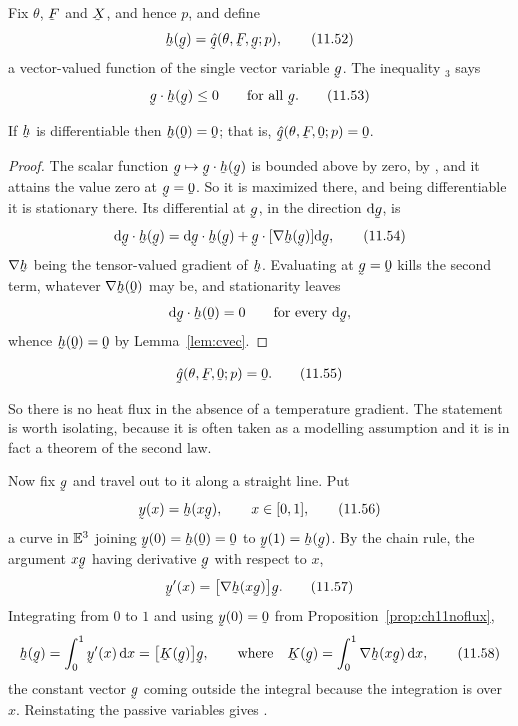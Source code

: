 Fix $\theta$, $\bF$ and $\bX$, and hence $p$, and define
\begin{equation}
   \bh(\bg)=\hat\bq(\theta,\bF,\bg;p),
   \tag{11.52}\label{eq:11.52}
\end{equation}
a vector-valued function of the single vector variable $\bg$. The
inequality $_{3}$ says
\begin{equation}
   \ip\bg{\bh(\bg)}\leq0\qquad\text{for all }\bg .
   \tag{11.53}\label{eq:11.53}
\end{equation}

\begin{proposition}\label{prop:ch11noflux}
If $\bh$ is differentiable then $\bh(\bze)=\bze$; that is,
$\hat\bq(\theta,\bF,\bze;p)=\bze$.
\end{proposition}

\begin{proof}
The scalar function $\bg\mapsto\ip\bg{\bh(\bg)}$ is bounded above by
zero, by , and it attains the value zero at $\bg=\bze$. So it
is maximized there, and being differentiable it is stationary there. Its
differential at $\bg$, in the direction $\dl\bg$, is
\begin{equation}
   \dl\ip\bg{\bh(\bg)}
   =\ip{\dl\bg}{\bh(\bg)}+\ip\bg{[\nabla\bh(\bg)]\dl\bg} ,
   \tag{11.54}\label{eq:11.54}
\end{equation}
$\nabla\bh$ being the tensor-valued gradient of $\bh$. Evaluating at
$\bg=\bze$ kills the second term, whatever $\nabla\bh(\bze)$ may be, and
stationarity leaves
\[
   \ip{\dl\bg}{\bh(\bze)}=0\qquad\text{for every }\dl\bg ,
\]
whence $\bh(\bze)=\bze$ by Lemma~\ref{lem:cvec}.
\end{proof}

\begin{equation}
   \hat\bq(\theta,\bF,\bze;p)=\bze .
   \tag{11.55}\label{eq:11.55}
\end{equation}

So there is no heat flux in the absence of a temperature gradient. The
statement is worth isolating, because it is often taken as a modelling
assumption and it is in fact a theorem of the second law.

Now fix $\bg$ and travel out to it along a straight line. Put
\begin{equation}
   \by(x)=\bh(x\bg),\qquad x\in[0,1] ,
   \tag{11.56}\label{eq:11.56}
\end{equation}
a curve in $\mathbb{E}^{3}$ joining $\by(0)=\bh(\bze)=\bze$ to $\by(1)=\bh(\bg)$.
By the chain rule, the argument $x\bg$ having derivative $\bg$ with
respect to $x$,
\begin{equation}
   \by'(x)=\big[\nabla\bh(x\bg)\big]\bg .
   \tag{11.57}\label{eq:11.57}
\end{equation}
Integrating from $0$ to $1$ and using $\by(0)=\bze$ from
Proposition~\ref{prop:ch11noflux},
\begin{equation}
   \bh(\bg)=\int^{1}_{0}\by'(x)\,\dl x=\big[\bK(\bg)\big]\bg ,
   \qquad\text{where}\quad
   \bK(\bg)=\int^{1}_{0}\nabla\bh(x\bg)\,\dl x ,
   \tag{11.58}\label{eq:11.58}
\end{equation}
the constant vector $\bg$ coming outside the integral because the
integration is over $x$. Reinstating the passive variables gives
.

